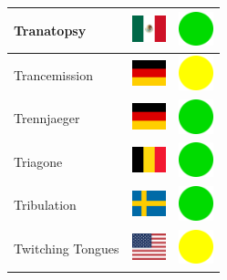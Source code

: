 \documentclass[12pt, a4paper, twoside]{report}
\begin{document}
\begin{center}
\begin{longtable}{|p{5cm}|p{2cm}|p{2cm}|}
 Tranatopsy                                                 & \includegraphics[width=1cm]{4x3/mx} &   \includegraphics[width=1cm]{likes/y} \\ \hline
 Trancemission                                              & \includegraphics[width=1cm]{4x3/de} &   \includegraphics[width=1cm]{likes/m} \\ \hline
 Trennjaeger                                                & \includegraphics[width=1cm]{4x3/de} &   \includegraphics[width=1cm]{likes/y} \\ \hline
 Triagone                                                   & \includegraphics[width=1cm]{4x3/be} &   \includegraphics[width=1cm]{likes/y} \\ \hline
 Tribulation                                                & \includegraphics[width=1cm]{4x3/se} &   \includegraphics[width=1cm]{likes/y} \\ \hline
 Twitching Tongues                                          & \includegraphics[width=1cm]{4x3/us} &   \includegraphics[width=1cm]{likes/m} \\ \hline

\end{longtable}
\end{center}
\end{document}
